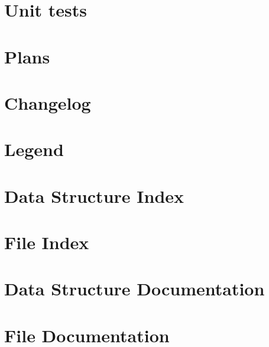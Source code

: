 \documentclass[twoside]{book}
\newcommand{\+}{\discretionary{\mbox{\scriptsize$\hookleftarrow$}}{}{}}
\begin{document}
\chapter{Unit tests}
\label{unit_tests}
\hypertarget{unit_tests}{}

\chapter{Plans}
\label{plans}
\hypertarget{plans}{}

\chapter{Changelog}
\label{changelog}
\hypertarget{changelog}{}

\chapter{Legend}
\label{legend}
\hypertarget{legend}{}

\chapter{Data Structure Index}

\chapter{File Index}

\chapter{Data Structure Documentation}









\chapter{File Documentation}















\newpage
{}
{}
\printindex
\end{document}
